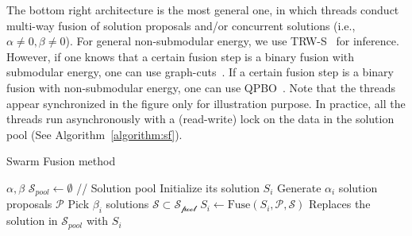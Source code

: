 %
The bottom right architecture is the most general one, in which threads
conduct multi-way fusion of solution proposals and/or concurrent
solutions (i.e., $\alpha\ne 0, \beta \ne 0$).
%
For general non-submodular energy, we use TRW-S~\cite{TRW-S, opengm} for inference.
%
However, if one knows that a certain fusion step is a binary fusion with
submodular energy, one can use
graph-cuts~\cite{alpha_expansion}. If a certain fusion step is a
binary fusion with non-submodular energy, one can use
QPBO~\cite{second_order_stereo}.
%
Note that the threads appear synchronized in the figure only for
illustration purpose. In practice, all the threads run asynchronously
with a (read-write) lock on the data in the solution pool (See
Algorithm~\ref{algorithm:sf}).
%
%
%
\begin{algorithm}
 \caption{Swarm Fusion method}
 \label{algorithm:sf}
 \begin{algorithmic}
  \Procedure{} {$\alpha, \beta$}
  \State $\mathcal{S}_{pool} \leftarrow \emptyset$ //
  Solution pool
  \State Initialize its solution $S_i$
  \EndFor
  \State
  \State Generate $\alpha_i$ solution proposals $\mathcal{P}$ %
  \State Pick $\beta_i$ solutions $\mathcal{S} \subset \mathcal{S_{\mbox{pool}}}$
  \State $S_i \leftarrow \mbox{Fuse}(S_i, \mathcal{P}, \mathcal{S})$
  \State Replaces the solution in $\mathcal{S}_{pool}$ with $S_i$
  \EndFor
  \EndProcedure
 \end{algorithmic}
\end{algorithm}



